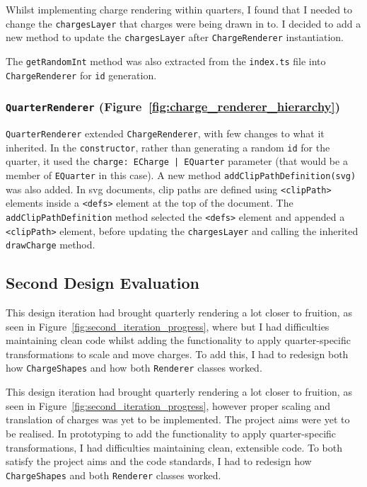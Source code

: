 \documentclass[nobib, a4paper, twoside, justified]{tufte-book}
\makeatletter
\newcommand{\svg}{\gls{svg}\@\xspace}
\newcommand{\charge}{\gls{charge}\@\xspace}
\newcommand{\charges}{\glspl{charge}\@\xspace}
\newcommand{\quarters}{\glspl{quarter}\@\xspace}
\makeatother
\begin{document}
Whilst implementing \charge rendering within \quarters, I found that I needed to change the
\texttt{chargesLayer} that \charges were being drawn in to. I decided to add a new method to update
the \texttt{chargesLayer} after \texttt{ChargeRenderer} instantiation.

The \texttt{getRandomInt} method was also extracted from the \texttt{index.ts} file
into \texttt{ChargeRenderer} for \texttt{id} generation.

\subsubsection{\texttt{QuarterRenderer} (Figure~\ref{fig:charge_renderer_hierarchy})}%
\label{ssub:quarter_renderer}

\texttt{QuarterRenderer} extended \texttt{ChargeRenderer}, with few changes to what it inherited.
In the \texttt{constructor}, rather than generating a random \texttt{id} for the quarter, it used
the \texttt{charge: ECharge | EQuarter} parameter (that would be a member of \texttt{EQuarter} in
this case). A new method \texttt{addClipPathDefinition(svg)} was also added. In \svg documents,
clip paths are defined using \texttt{<clipPath>} elements inside a \texttt{<defs>} element at the
top of the document. The \texttt{addClipPathDefinition} method selected the \texttt{<defs>} element
and appended a \texttt{<clipPath>} element, before updating the \texttt{chargesLayer} and calling
the inherited \texttt{drawCharge} method.

\subsection{Second Design Evaluation}%
\label{sub:second_design_evaluation}

This design iteration had brought quarterly rendering a lot closer to fruition, as seen in
Figure~\ref{fig:second_iteration_progress}, where  but I had difficulties maintaining clean code whilst
adding the functionality to apply quarter-specific transformations to scale and move \charges. To
add this, I had to redesign both how \texttt{ChargeShapes} and how both \texttt{Renderer} classes
worked.

This design iteration had brought quarterly rendering a lot closer to fruition, as seen in
Figure~\ref{fig:second_iteration_progress}, however proper scaling and translation of charges was
yet to be implemented. The project aims were yet to be realised. In prototyping to add the
functionality to apply quarter-specific transformations, I had difficulties maintaining clean,
extensible code. To both satisfy the project aims and the code standards, I had to redesign how
\texttt{ChargeShapes} and both \texttt{Renderer} classes worked.
\end{document}

